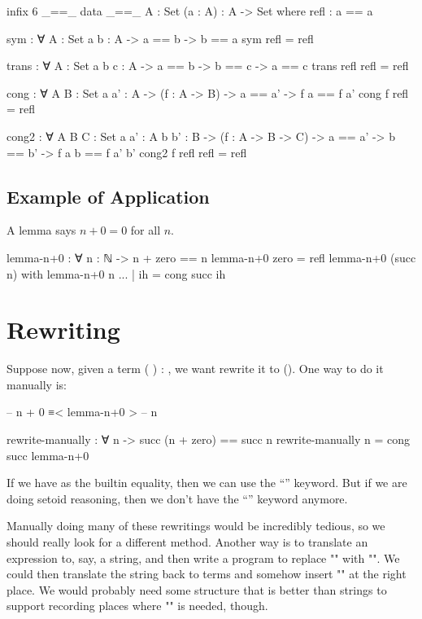 \documentclass{article}
\begin{document}
\begin{code}
infix 6 _==_
data _==_ {A : Set} (a : A) : A -> Set where
  refl : a == a

sym : ∀ {A : Set} {a b : A} -> a == b -> b == a
sym refl = refl

trans : ∀ {A : Set} {a b c : A} -> a == b -> b == c -> a == c
trans refl refl = refl

cong : ∀ {A B : Set} {a a' : A} ->
       (f : A -> B) -> a == a' -> f a == f a'
cong f refl = refl

cong2 : ∀ {A B C : Set} {a a' : A} {b b' : B} ->
        (f : A -> B -> C) -> a == a' -> b == b' -> f a b == f a' b'
cong2 f refl refl = refl
\end{code}

\subsection{Example of Application}

A lemma says \(n + 0 = 0\) for all \(n\).

\begin{code}
lemma-n+0 : ∀ {n : ℕ} -> n + zero == n
lemma-n+0 {zero} = refl
lemma-n+0 {(succ n)} with lemma-n+0 {n}
... | ih = cong succ ih
\end{code}

\section{Rewriting}

Suppose now, given a term \AgdaSymbol( \AgdaOperator{\AgdaInductiveConstructor{+}} \AgdaSymbol) \AgdaSymbol: , we want rewrite it to \AgdaSymbol(\AgdaSymbol). One way to do it manually is:

\begin{code}
--  n + 0 ≡< lemma-n+0 >
--  n
\end{code}

\begin{code}
rewrite-manually : ∀ n -> succ (n + zero) == succ n
rewrite-manually n = cong succ lemma-n+0
\end{code}

If we have \AgdaFunction{\AgdaUnderscore{}==\AgdaUnderscore{}} as the builtin equality, then we can use the ``'' keyword. But if we are doing setoid reasoning, then we don't have the ``'' keyword anymore.

Manually doing many of these rewritings would be incredibly tedious, so we should really look for a different method. Another way is to translate an expression to, say, a string, and then write a program to replace "" with "". We could then translate the string back to terms and somehow insert "" at the right place. We would probably need some structure that is better than strings to support recording places where "" is needed, though.
\end{document}
